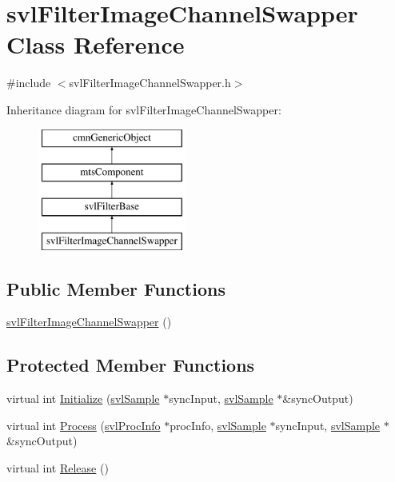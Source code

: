 \hypertarget{classsvl_filter_image_channel_swapper}{}\section{svl\+Filter\+Image\+Channel\+Swapper Class Reference}
\label{classsvl_filter_image_channel_swapper}


{\ttfamily \#include $<$svl\+Filter\+Image\+Channel\+Swapper.\+h$>$}

Inheritance diagram for svl\+Filter\+Image\+Channel\+Swapper\+:\begin{figure}[H]
\begin{center}
\leavevmode
\includegraphics[height=4.000000cm]{d9/d87/classsvl_filter_image_channel_swapper}
\end{center}
\end{figure}
\subsection*{Public Member Functions}
\begin{DoxyCompactItemize}
\item 
\hyperlink{classsvl_filter_image_channel_swapper_a1e5aa79344f274867153fedc713dceda}{svl\+Filter\+Image\+Channel\+Swapper} ()
\end{DoxyCompactItemize}
\subsection*{Protected Member Functions}
\begin{DoxyCompactItemize}
\item 
virtual int \hyperlink{classsvl_filter_image_channel_swapper_ac9e9f46346a95a42b233a4df35d3d3b4}{Initialize} (\hyperlink{classsvl_sample}{svl\+Sample} $\ast$sync\+Input, \hyperlink{classsvl_sample}{svl\+Sample} $\ast$\&sync\+Output)
\item 
virtual int \hyperlink{classsvl_filter_image_channel_swapper_a2884044db183316e22e856c5d6f17ac9}{Process} (\hyperlink{structsvl_proc_info}{svl\+Proc\+Info} $\ast$proc\+Info, \hyperlink{classsvl_sample}{svl\+Sample} $\ast$sync\+Input, \hyperlink{classsvl_sample}{svl\+Sample} $\ast$\&sync\+Output)
\item 
virtual int \hyperlink{classsvl_filter_image_channel_swapper_a8d81a4bc8c8c0dd5ef8fa2fa8a213e9b}{Release} ()
\end{DoxyCompactItemize}
